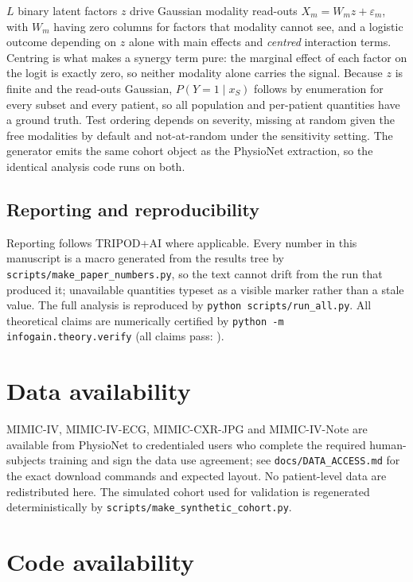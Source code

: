 \documentclass[11pt]{article}
\theoremstyle{definition}
\theoremstyle{remark}
\begin{document}
$L$ binary latent factors $z$ drive Gaussian modality read-outs
$X_m = W_m z + \varepsilon_m$, with $W_m$ having zero columns for factors that
modality cannot see, and a logistic outcome depending on $z$ alone with main
effects and \emph{centred} interaction terms. Centring is what makes a synergy
term pure: the marginal effect of each factor on the logit is exactly zero, so
neither modality alone carries the signal. Because $z$ is finite and the
read-outs Gaussian, $P(Y=1\mid x_S)$ follows by enumeration for every subset and
every patient, so all population and per-patient quantities have a ground truth.
Test ordering depends on severity, missing at random given the free modalities by
default and not-at-random under the sensitivity setting. The generator emits the
same cohort object as the PhysioNet extraction, so the identical analysis code
runs on both.

\subsection{Reporting and reproducibility}

Reporting follows TRIPOD+AI \citep{collins2024tripodllm} where applicable. Every
number in this manuscript is a macro generated from the results tree by
\texttt{scripts/make\_paper\_numbers.py}, so the text cannot drift from the run
that produced it; unavailable quantities typeset as a visible marker rather than
a stale value. The full analysis is reproduced by
\texttt{python scripts/run\_all.py}. All theoretical claims are numerically
certified by \texttt{python -m infogain.theory.verify}
(all claims pass: \thyAllHold).

\section*{Data availability}

MIMIC-IV, MIMIC-IV-ECG, MIMIC-CXR-JPG and MIMIC-IV-Note are available from
PhysioNet to credentialed users who complete the required human-subjects
training and sign the data use agreement; see \texttt{docs/DATA\_ACCESS.md} for
the exact download commands and expected layout. No patient-level data are
redistributed here. The simulated cohort used for validation is regenerated
deterministically by \texttt{scripts/make\_synthetic\_cohort.py}.

\section*{Code availability}
\end{document}
